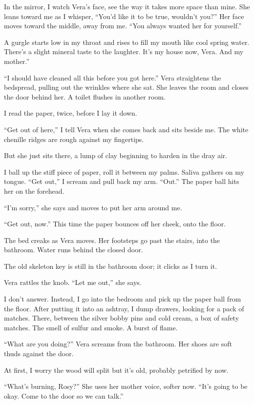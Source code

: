 \documentclass[twoside,10pt]{book}
\begin{document}
In the mirror, I watch Vera's face, see the way it takes more space than
mine. She leans toward me as I whisper, ``You'd like it to be true,
wouldn't you?'' Her face moves toward the middle, away from me. ``You
always wanted her for yourself.''

A gurgle starts low in my throat and rises to fill my mouth like cool
spring water. There's a slight mineral taste to the laughter. It's my
house now, Vera. And my mother.''

``I should have cleaned all this before you got here.'' Vera straightens
the bedspread, pulling out the wrinkles where she sat. She leaves the
room and closes the door behind her. A toilet flushes in another room.

I read the paper, twice, before I lay it down.

``Get out of here,'' I tell Vera when she comes back and sits beside me.
The white chenille ridges are rough against my fingertips.

But she just sits there, a lump of clay beginning to harden in the dray
air.

I ball up the stiff piece of paper, roll it between my palms. Saliva
gathers on my tongue. ``Get out,'' I scream and pull back my arm.
``Out.'' The paper ball hits her on the forehead.

``I'm sorry,'' she says and moves to put her arm around me.

``Get out, now.'' This time the paper bounces off her cheek, onto the
floor.

The bed creaks as Vera moves. Her footsteps go past the stairs, into the
bathroom. Water runs behind the closed door.

The old skeleton key is still in the bathroom door; it clicks as I turn
it.

Vera rattles the knob. ``Let me out,'' she says.

I don't answer. Instead, I go into the bedroom and pick up the paper
ball from the floor. After putting it into an ashtray, I dump drawers,
looking for a pack of matches. There, between the silver bobby pins and
cold cream, a box of safety matches. The smell of sulfur and smoke. A
burst of flame.

``What are you doing?'' Vera screams from the bathroom. Her shoes are
soft thuds against the door.

At first, I worry the wood will split but it's old, probably petrified
by now.

``What's burning, Rosy?'' She uses her mother voice, softer now. ``It's
going to be okay. Come to the door so we can talk.''
\end{document}
